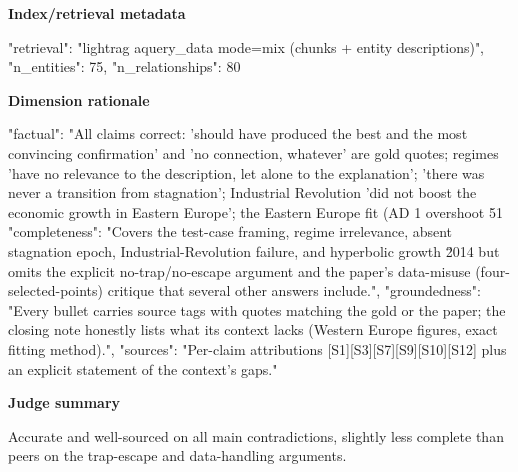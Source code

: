\documentclass[10pt]{article}
\begin{document}
\textbf{Index/retrieval metadata}
\begin{EvidenceText}
{
  "retrieval": "lightrag aquery_data mode=mix (chunks + entity descriptions)",
  "n_entities": 75,
  "n_relationships": 80
}
\end{EvidenceText}

\textbf{Dimension rationale}
\begin{EvidenceText}
{
  "factual": "All claims correct: 'should have produced the best and the most convincing confirmation' and 'no connection, whatever' are gold quotes; regimes 'have no relevance to the description, let alone to the explanation'; 'there was never a transition from stagnation'; Industrial Revolution 'did not boost the economic growth in Eastern Europe'; the Eastern Europe fit (AD 1 overshoot 51%
  "completeness": "Covers the test-case framing, regime irrelevance, absent stagnation epoch, Industrial-Revolution failure, and hyperbolic growth \u2014 but omits the explicit no-trap/no-escape argument and the paper's data-misuse (four-selected-points) critique that several other answers include.",
  "groundedness": "Every bullet carries source tags with quotes matching the gold or the paper; the closing note honestly lists what its context lacks (Western Europe figures, exact fitting method).",
  "sources": "Per-claim attributions [S1][S3][S7][S9][S10][S12] plus an explicit statement of the context's gaps."
}
\end{EvidenceText}

\textbf{Judge summary}
\begin{EvidenceText}
Accurate and well-sourced on all main contradictions, slightly less complete than peers on the trap-escape and data-handling arguments.
\end{EvidenceText}
\end{document}
